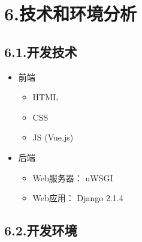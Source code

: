 \documentclass{article}
\begin{document}
\section{6.\hspace*{0.5em}技术和环境分析}\label{6}%

\subsection{6.1.\hspace*{0.5em}开发技术}\label{61}%

\begin{itemize}[noitemsep,topsep=\mdcompacttopsep]%

\item{}前端

\begin{itemize}[noitemsep,topsep=\mdcompacttopsep]%

\item{}HTML%

\item{}CSS%

\item{}JS (Vue.js)%
\end{itemize}%

\item{}后端

\begin{itemize}[noitemsep,topsep=\mdcompacttopsep]%

\item{}Web服务器： uWSGI%

\item{}Web应用： Django 2.1.4%
\end{itemize}%
\end{itemize}%

\subsection{6.2.\hspace*{0.5em}开发环境}\label{62}%
\end{document}
